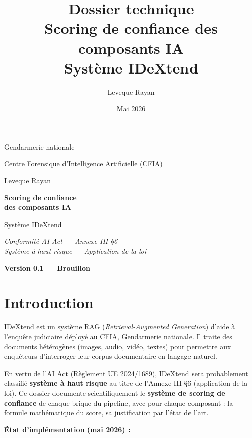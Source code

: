 \documentclass[11pt,a4paper]{report}
\title{Dossier technique\\[0.4em]
\large Scoring de confiance des composants IA\\[0.2em]
\large Système IDeXtend}
\author{Leveque Rayan}
\date{Mai 2026}
\begin{document}
\begin{titlepage}
\centering
\vspace*{2cm}
{\Large Gendarmerie nationale \par}
\vspace{0.3cm}
{\large Centre Forensique d'Intelligence Artificielle (CFIA) \par}
\vspace{0.3cm}
{\large Leveque Rayan \par}
\vfill
{\Huge\bfseries Scoring de confiance\\[0.4em]
des composants IA\par}
\vspace{0.8cm}
{\Large Système IDeXtend\par}
\vfill
{\large\textit{Conformité AI Act --- Annexe III §6\\
Système à haut risque --- Application de la loi}\par}
\vspace{1cm}
{\Large\textbf{Version 0.1 --- Brouillon}\par}
\vspace*{2cm}
\end{titlepage}

\setcounter{tocdepth}{0}
\tableofcontents
\clearpage

\chapter*{Introduction}

IDeXtend est un système RAG (\textit{Retrieval-Augmented Generation}) d'aide à
l'enquête judiciaire déployé au CFIA, Gendarmerie nationale. Il traite des
documents hétérogènes (images, audio, vidéo, textes) pour permettre aux
enquêteurs d'interroger leur corpus documentaire en langage naturel.

En vertu de l'AI Act (Règlement UE 2024/1689), IDeXtend sera probablement classifié
\textbf{système à haut risque} au titre de l'Annexe III §6 (application de la
loi). Ce dossier documente scientifiquement le \textbf{système de scoring de
confiance} de chaque brique du pipeline, avec pour chaque composant : la
formule mathématique du score, sa justification par l'état de l'art.

\bigskip
\noindent\textbf{État d'implémentation (mai 2026) :}
\end{document}
